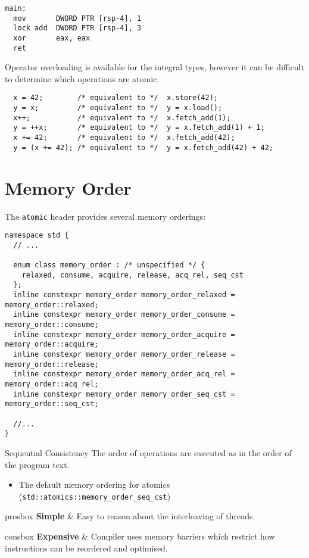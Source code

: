 \hfill
\begin{minipage}{.49\textwidth}
	\begin{verbatim}
main:
  mov       DWORD PTR [rsp-4], 1
  lock add  DWORD PTR [rsp-4], 3
  xor       eax, eax
  ret

  \end{verbatim}
\end{minipage}

Operator overloading is available for the integral types, however it can be difficult to determine which operations are atomic.
\begin{verbatim}
  x = 42;        /* equivalent to */  x.store(42);
  y = x;         /* equivalent to */  y = x.load();
  x++;           /* equivalent to */  x.fetch_add(1);
  y = ++x;       /* equivalent to */  y = x.fetch_add(1) + 1;
  x += 42;       /* equivalent to */  x.fetch_add(42);
  y = (x += 42); /* equivalent to */  y = x.fetch_add(42) + 42;
\end{verbatim}

\section{Memory Order}
The \texttt{atomic} header provides several memory orderings:
\begin{verbatim}
namespace std {
  // ...

  enum class memory_order : /* unspecified */ {
    relaxed, consume, acquire, release, acq_rel, seq_cst
  };
  inline constexpr memory_order memory_order_relaxed = memory_order::relaxed;
  inline constexpr memory_order memory_order_consume = memory_order::consume;
  inline constexpr memory_order memory_order_acquire = memory_order::acquire;
  inline constexpr memory_order memory_order_release = memory_order::release;
  inline constexpr memory_order memory_order_acq_rel = memory_order::acq_rel;
  inline constexpr memory_order memory_order_seq_cst = memory_order::seq_cst;

  //...
}
\end{verbatim}

\begin{definitionbox}{Sequential Consistency}
	The order of operations are executed as in the order of the program text.
	\begin{itemize}
		\item The default memory ordering for atomics (\texttt{std::atomics::memory_order_seq_cst})
	\end{itemize}
	\begin{tabbox}{prosbox}
		\textbf{Simple} & Easy to reason about the interleaving of threads. \\
	\end{tabbox}
	\begin{tabbox}{consbox}
		\textbf{Expensive} & Compiler uses memory barriers which restrict how instructions can be reordered and optimised. \\
	\end{tabbox}
\end{definitionbox}

